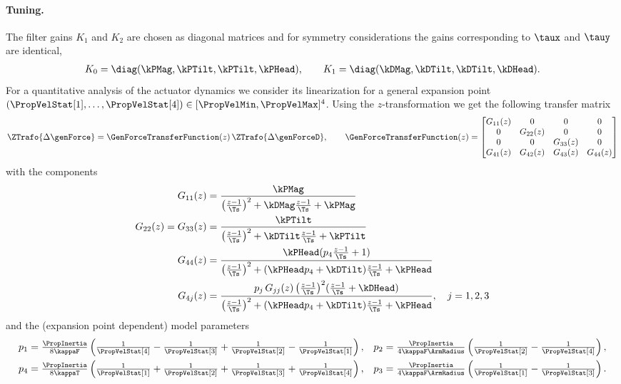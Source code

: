 \paragraph{Tuning.}
The filter gains $K_1$ and $K_2$ are chosen as diagonal matrices and for symmetry considerations the gains corresponding to $\taux$ and $\tauy$ are identical, \ie
\begin{align}
 K_0 = \diag(\kPMag, \kPTilt, \kPTilt, \kPHead),
\qquad
 K_1 = \diag(\kDMag, \kDTilt, \kDTilt, \kDHead).
\end{align}
For a quantitative analysis of the actuator dynamics we consider its linearization for a general expansion point $(\PropVelStat[1], \ldots, \PropVelStat[4]) \in [\PropVelMin, \PropVelMax]^4$.
Using the $z$-transformation we get the following transfer matrix 
\begin{align}
 \ZTrafo{\Delta \genForce} = \GenForceTransferFunction(z) \, \ZTrafo{\Delta \genForceD},
\qquad
 \GenForceTransferFunction(z) =
 \begin{bmatrix}
  G_{11}(z) & 0 & 0 & 0 \\
  0 & G_{22}(z) & 0 & 0 \\
  0 & 0 & G_{33}(z) & 0 \\
  G_{41}(z) & G_{42}(z) & G_{43}(z) & G_{44}(z) \\
 \end{bmatrix}
\end{align}
with the components
\begin{subequations}\label{eq:QuadActuatorDynTransferComponents}
\begin{align}
 G_{11}(z) &= \frac{\kPMag}{\big(\tfrac{z-1}{\Ts}\big)^2 + \kDMag \tfrac{z-1}{\Ts} + \kPMag}
\\
 G_{22}(z) = G_{33}(z) &= \frac{\kPTilt}{\big(\tfrac{z-1}{\Ts}\big)^2 + \kDTilt \tfrac{z-1}{\Ts} + \kPTilt}
\\
 G_{44}(z) &= \frac{\kPHead(p_4\tfrac{z-1}{\Ts} + 1)}{\big(\tfrac{z-1}{\Ts}\big)^2 + (\kPHead p_4 + \kDTilt) \tfrac{z-1}{\Ts} + \kPHead}
\\
 G_{4j}(z) &= \frac{p_j\,G_{jj}(z)\,\big(\tfrac{z-1}{\Ts}\big)^2 (\tfrac{z-1}{\Ts} + \kDHead)}{\big(\tfrac{z-1}{\Ts}\big)^2 + (\kPHead p_4 + \kDTilt) \tfrac{z-1}{\Ts} + \kPHead}, \quad j=1,2,3
\end{align}
\end{subequations}
and the (expansion point dependent) model parameters
\begin{subequations}
\begin{align}
 p_1 &= \tfrac{\PropInertia}{8\kappaF} \left( \tfrac{1}{\PropVelStat[4]} - \tfrac{1}{\PropVelStat[3]} + \tfrac{1}{\PropVelStat[2]} - \tfrac{1}{\PropVelStat[1]} \right),&
 p_2 &= \tfrac{\PropInertia}{4\kappaF\ArmRadius} \left( \tfrac{1}{\PropVelStat[2]} - \tfrac{1}{\PropVelStat[4]} \right),
\\
 p_4 &= \tfrac{\PropInertia}{8\kappaT} \left( \tfrac{1}{\PropVelStat[1]} + \tfrac{1}{\PropVelStat[2]} + \tfrac{1}{\PropVelStat[3]} + \tfrac{1}{\PropVelStat[4]} \right),&
 p_3 &= \tfrac{\PropInertia}{4\kappaF\ArmRadius} \left( \tfrac{1}{\PropVelStat[1]} - \tfrac{1}{\PropVelStat[3]} \right).
\end{align}
\end{subequations}
